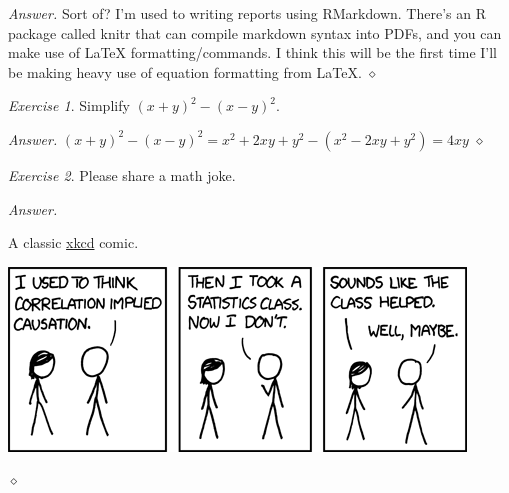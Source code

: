 \documentclass[12pt,oneside]{amsart}
\theoremstyle{remark}
\newtheorem{exer}{Exercise}
\newenvironment{answer}{\bigskip\noindent\emph{Answer.}}{\hfill$\diamond$\newline}
\begin{document}
\begin{answer}
Sort of? I'm used to writing reports using RMarkdown. There's an R package called knitr that can compile markdown syntax into PDFs, and you can make use of LaTeX formatting/commands. I think this will be the first time I'll be making heavy use of equation formatting from LaTeX.
\end{answer}

\newpage
\begin{exer}
Simplify $(x+y)^2 - (x-y)^2$.
\end{exer}
\begin{answer}
$(x+y)^2 - (x-y)^2 = x^2 + 2xy + y^2 - (x^2 - 2xy + y^2) = 4xy$
\end{answer}

\newpage
\begin{exer}
Please share a math joke.
\end{exer}

\begin{answer}

A classic \href{https://xkcd.com/552/}{xkcd} comic. \newline

\includegraphics{../assets/correlation.png}

\end{answer}
\end{document}
